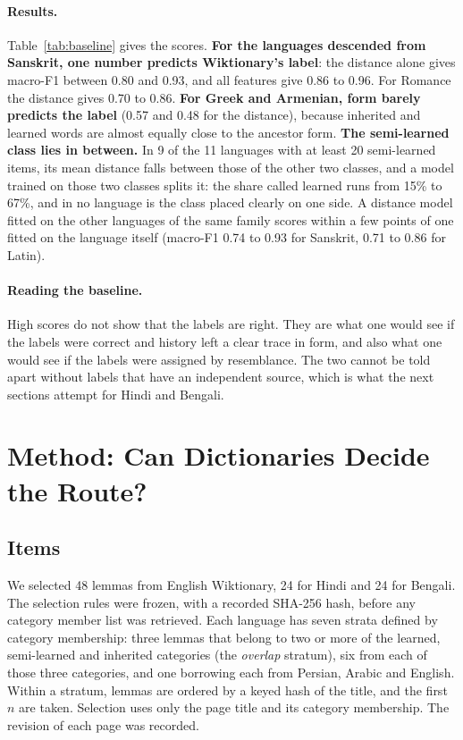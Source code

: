\documentclass[11pt]{article}
\begin{document}
\paragraph{Results.} Table~\ref{tab:baseline} gives the scores. \textbf{For the languages descended from Sanskrit, one number predicts Wiktionary's label}: the distance alone gives macro-F1 between 0.80 and 0.93, and all features give 0.86 to 0.96. For Romance the distance gives 0.70 to 0.86. \textbf{For Greek and Armenian, form barely predicts the label} (0.57 and 0.48 for the distance), because inherited and learned words are almost equally close to the ancestor form. \textbf{The semi-learned class lies in between.} In 9 of the 11 languages with at least 20 semi-learned items, its mean distance falls between those of the other two classes, and a model trained on those two classes splits it: the share called learned runs from 15\% to 67\%, and in no language is the class placed clearly on one side. A distance model fitted on the other languages of the same family scores within a few points of one fitted on the language itself (macro-F1 0.74 to 0.93 for Sanskrit, 0.71 to 0.86 for Latin).

\paragraph{Reading the baseline.} High scores do not show that the labels are right. They are what one would see if the labels were correct and history left a clear trace in form, and also what one would see if the labels were assigned by resemblance. The two cannot be told apart without labels that have an independent source, which is what the next sections attempt for Hindi and Bengali.

\section{Method: Can Dictionaries Decide the Route?}
\label{sec:method}

\subsection{Items}

We selected 48 lemmas from English Wiktionary, 24 for Hindi and 24 for Bengali. The selection rules were frozen, with a recorded SHA-256 hash, before any category member list was retrieved. Each language has seven strata defined by category membership: three lemmas that belong to two or more of the learned, semi-learned and inherited categories (the \textit{overlap} stratum), six from each of those three categories, and one borrowing each from Persian, Arabic and English. Within a stratum, lemmas are ordered by a keyed hash of the title, and the first $n$ are taken. Selection uses only the page title and its category membership. The revision of each page was recorded.
\end{document}
